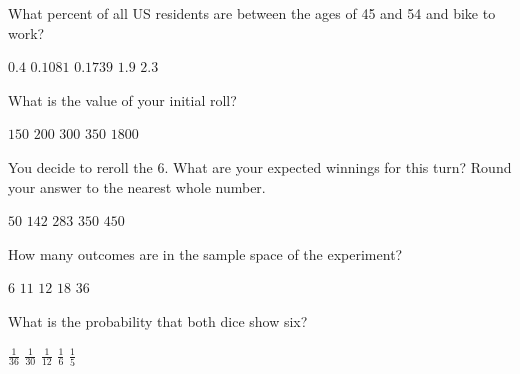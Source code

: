\documentclass[answers,12pt]{exam}
\begin{document}
\begin{questions}
\question\label{LastWalk}
What percent of all US residents are between the ages
of 45 and 54 and bike to work?\\
\begin{oneparchoices}
\correctchoice $0.4$
\choice $0.1081$ %
\choice $0.1739$ %
\choice $1.9$ %
\choice $2.3$ %
\end{oneparchoices}


\question\label{FirstF}
What is the value of your initial roll?\\
\begin{oneparchoices}
\choice $150$ %
\choice $200$ %
\choice $300$ %
\correctchoice $350$
\choice $1800$ %
\end{oneparchoices}

\question\label{LastF}
You decide to reroll the $6$. What are your expected
winnings for this turn? Round your answer to the nearest whole number.\\
\begin{oneparchoices}
\choice $50$ %
\correctchoice $142$
\choice $283$ %
\choice $350$ %
\choice $450$ %
\end{oneparchoices}
\newpage


\question\label{FirstDice}
How many outcomes are in the sample space of the experiment?\\
\begin{oneparchoices}
\choice $6$ %
\choice $11$ %
\choice $12$ %
\choice $18$
\correctchoice $36$
\end{oneparchoices}

\question What is the probability that both dice show six?\\
\begin{oneparchoices}
\correctchoice $\frac{1}{36}$
\choice $\frac{1}{30}$ %
\choice $\frac{1}{12}$ %
\choice $\frac{1}{6}$
\choice $\frac{1}{5}$ %
\end{oneparchoices}


\end{questions}
\end{document}
